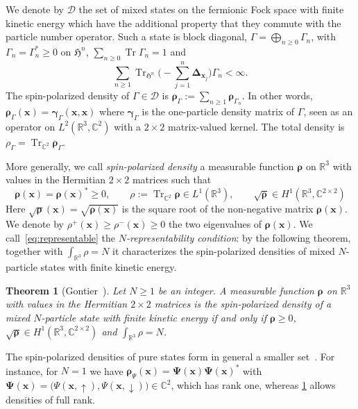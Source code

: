 \documentclass[final,reqno]{amsart}
\newtheorem{theorem}{Theorem}[section]
\theoremstyle{remark}
\renewcommand{\ge}{\geqslant}
\newcommand{\spu}{\uparrow}
\newcommand{\spd}{\downarrow}
\DeclareMathOperator{\Tr}{Tr}
\newcommand{\Trs}{\Tr_{\CC^2}}
\newcommand{\RR}{\mathbb{R}}
\newcommand{\CC}{\mathbb{C}}
\newcommand{\lapl}{\bm{\Delta}}
\newcommand{\HF}{\mathfrak{H}}
\begin{document}
We denote by $\mathcal{D}$ the set of mixed states on the fermionic Fock space with finite kinetic energy which have the additional property that they commute with the particle number operator. Such a state is block diagonal, $\Gamma=\bigoplus_{n\ge0}\Gamma_n$, with $\Gamma_n=\Gamma_n^*\ge0$ on $\HF^n$, $\sum_{n\ge0}\Tr\Gamma_n=1$ and
$$
\sum_{n\ge1}\Tr_{\HF^n}\Bigg(-\sum_{j=1}^n\lapl_{\mathbf{x}_j}\Bigg)\Gamma_n<\infty.
$$
The spin-polarized density of $\Gamma\in\mathcal{D}$ is $\bm{\rho}_\Gamma:=\sum_{n\ge1}\bm{\rho}_{\Gamma_n}$. In other words, $\bm{\rho}_\Gamma(\mathbf{x})=\bm{\gamma}_\Gamma(\mathbf{x},\mathbf{x})$ where $\bm{\gamma}_\Gamma$ is the one-particle density matrix of $\Gamma$, seen as an operator on $L^2(\RR^3,\CC^2)$ with a $2\times 2$ matrix-valued kernel. The total density is $\rho_\Gamma=\Trs \bm{\rho}_\Gamma$.

More generally, we call \emph{spin-polarized density} a measurable function $\bm{\rho}$ on $\RR^3$ with values in the Hermitian $2\times 2$ matrices such that
\begin{equation}\label{eq:representable}
\boxed{\bm{\rho}(\mathbf{x})=\bm{\rho}(\mathbf{x})^*\ge0,\qquad \rho:=\Trs \bm{\rho}\in L^1(\RR^3),\qquad \sqrt{\bm{\rho}}\in H^1(\RR^3,\CC^{2\times 2})}
\end{equation}
Here $\sqrt{\bm{\rho}}(\mathbf{x})=\sqrt{\bm{\rho}(\mathbf{x})}$ is the square root of the non-negative matrix $\bm{\rho}(\mathbf{x})$. We denote by $\rho^+(\mathbf{x})\ge\rho^-(\mathbf{x})\ge0$ the two eigenvalues of $\bm{\rho}(\mathbf{x})$. We call~\cref{eq:representable} the \emph{$N$-representability condition}: by the following theorem, together with $\int_{\RR^3}\rho=N$ it characterizes the spin-polarized densities of mixed $N$-particle states with finite kinetic energy.

\begin{theorem}[Gontier~\cite{gontier2013n}]\label{thm:Gontier}
Let $N\ge1$ be an integer. A measurable function $\bm{\rho}$ on $\RR^3$ with values in the Hermitian $2\times 2$ matrices is the spin-polarized density of a mixed $N$-particle state with finite kinetic energy if and only if $\bm{\rho}\ge0$, $\sqrt{\bm{\rho}}\in H^1(\RR^3,\CC^{2\times2})$ and $\int_{\RR^3}\rho=N$.
\end{theorem}

The spin-polarized densities of pure states form in general a smaller set~\cite{gontier2013n}. For instance, for $N=1$ we have $\bm{\rho}_\Psi(\mathbf{x})=\bm{\Psi}(\mathbf{x})\bm{\Psi}(\mathbf{x})^*$ with $\bm{\Psi}(\mathbf{x})=\big(\Psi(\mathbf{x},\spu),\Psi(\mathbf{x},\spd)\big)\in\CC^2$, which has rank one, whereas \cref{thm:Gontier} allows densities of full rank.
\end{document}
